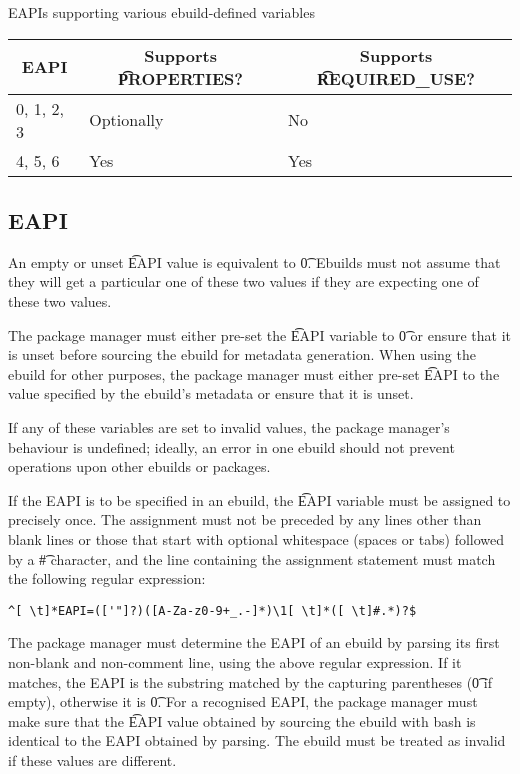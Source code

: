 \begin{centertable}{EAPIs supporting various ebuild-defined variables}
    \label{tab:optional-vars-table}
    \begin{tabular}{lll}
      \toprule
      \multicolumn{1}{c}{\textbf{EAPI}} &
      \multicolumn{1}{c}{\textbf{Supports \t{PROPERTIES}?}} &
      \multicolumn{1}{c}{\textbf{Supports \t{REQUIRED_USE}?}} \\
      \midrule
      0, 1, 2, 3        & Optionally & No  \\
      4, 5, 6           & Yes        & Yes \\
      \bottomrule
    \end{tabular}
\end{centertable}

\subsection{EAPI}
\label{sec:eapi}

An empty or unset \t{EAPI} value is equivalent to \t{0}. Ebuilds must not assume that they will get
a particular one of these two values if they are expecting one of these two values.

The package manager must either pre-set the \t{EAPI} variable to \t{0} or ensure that it is unset
before sourcing the ebuild for metadata generation. When using the ebuild for other purposes, the
package manager must either pre-set \t{EAPI} to the value specified by the ebuild's metadata or
ensure that it is unset.

If any of these variables are set to invalid values, the package manager's behaviour is undefined;
ideally, an error in one ebuild should not prevent operations upon other ebuilds or packages.

If the EAPI is to be specified in an ebuild, the \t{EAPI} variable must be assigned to precisely
once. The assignment must not be preceded by any lines other than blank lines or those that start
with optional whitespace (spaces or tabs) followed by a \t{\#} character, and the line containing
the assignment statement must match the following regular expression:
\begin{verbatim}
^[ \t]*EAPI=(['"]?)([A-Za-z0-9+_.-]*)\1[ \t]*([ \t]#.*)?$
\end{verbatim}

The package manager must determine the EAPI of an ebuild by parsing its first non-blank and
non-comment line, using the above regular expression. If it matches, the EAPI is the substring
matched by the capturing parentheses (\t{0} if empty), otherwise it is \t{0}. For a recognised
EAPI, the package manager must make sure that the \t{EAPI} value obtained by sourcing the ebuild
with bash is identical to the EAPI obtained by parsing. The ebuild must be treated as invalid if
these values are different.

